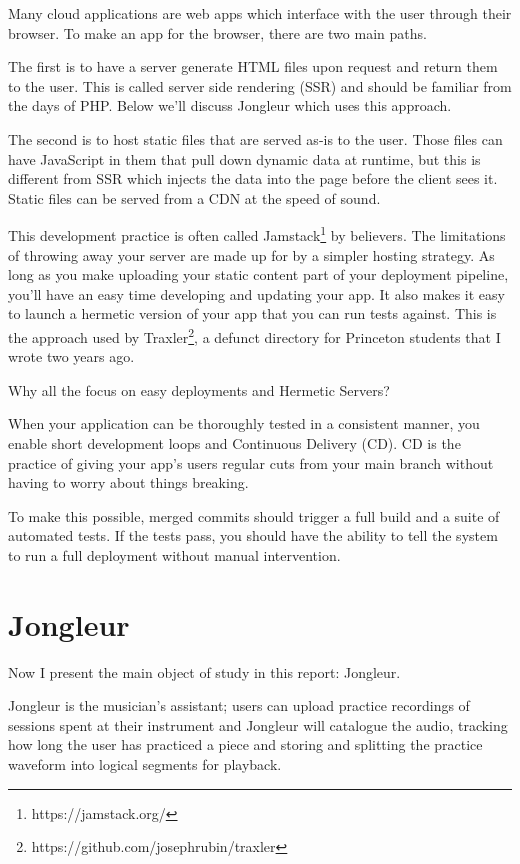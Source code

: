 \documentclass{article}
\newcommand{\infobox}[2]{
  \begin{tcolorbox}[width=\textwidth,colback={white},title={\strut\textbf{#1}},colbacktitle=blue!15,coltitle=black,boxrule=0.2pt,parbox=false]
    #2
  \end{tcolorbox}
}
\begin{document}
Many cloud applications are web apps which interface with the user through their browser.
To make an app for the browser, there are two main paths.

The first is to have a server generate HTML files upon request and return them to the user.
This is called server side rendering (SSR) and should be familiar from the days of PHP.
Below we'll discuss Jongleur which uses this approach.

The second is to host static files that are served as-is to the user.
Those files can have JavaScript in them that pull down dynamic data at runtime, but this is different from SSR which injects the data into the page before the client sees it.
Static files can be served from a CDN at the speed of sound.

This development practice is often called Jamstack\footnote{https://jamstack.org/} by believers.
The limitations of throwing away your server are made up for by a simpler hosting strategy.
As long as you make uploading your static content part of your deployment pipeline, you'll have an easy time developing and updating your app.
It also makes it easy to launch a hermetic version of your app that you can run tests against.
This is the approach used by Traxler\footnote{https://github.com/josephrubin/traxler}, a defunct directory for Princeton students that I wrote two years ago.

\infobox{Continuous delivery}{
  Why all the focus on easy deployments and Hermetic Servers?
  
  When your application can be thoroughly tested in a consistent manner, you enable short development loops and Continuous Delivery (CD).
  CD is the practice of giving your app's users regular cuts from your main branch without having to worry about things breaking.

  To make this possible, merged commits should trigger a full build and a suite of automated tests.
  If the tests pass, you should have the ability to tell the system to run a full deployment without manual intervention.
}

\section{Jongleur}
\label{JONG}

Now I present the main object of study in this report: Jongleur.

Jongleur is the musician's assistant; users can upload practice recordings of sessions spent at their instrument and Jongleur will catalogue the audio, tracking how long the user has practiced a piece and storing and splitting the practice waveform into logical segments for playback.
\end{document}
